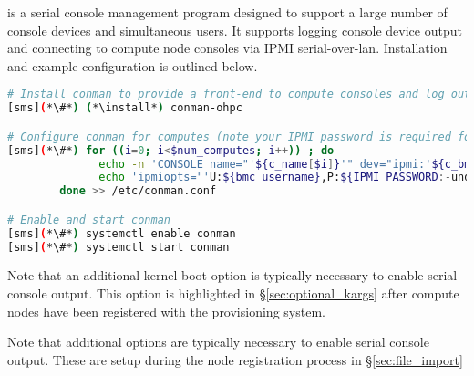 \conman{} is a serial console management program designed to support a large
number of console devices and simultaneous users. It supports logging console
device output and connecting to compute node consoles via IPMI
serial-over-lan. Installation and example configuration is outlined below.

\begin{lstlisting}[language=bash,keywords={},upquote=true]
# Install conman to provide a front-end to compute consoles and log output
[sms](*\#*) (*\install*) conman-ohpc

# Configure conman for computes (note your IPMI password is required for console access)
[sms](*\#*) for ((i=0; i<$num_computes; i++)) ; do
              echo -n 'CONSOLE name="'${c_name[$i]}'" dev="ipmi:'${c_bmc[$i]}'" '
              echo 'ipmiopts="'U:${bmc_username},P:${IPMI_PASSWORD:-undefined},W:solpayloadsize'"'
        done >> /etc/conman.conf

# Enable and start conman
[sms](*\#*) systemctl enable conman
[sms](*\#*) systemctl start conman
\end{lstlisting}

\noindent Note that an additional kernel boot option is typically necessary to
enable serial console output. This option is highlighted in \S\ref{sec:optional_kargs} after
compute nodes have been registered with the provisioning system.
\fi

\noindent Note that additional options are typically necessary to
enable serial console output. These are setup during the node registration
process in \S\ref{sec:file_import} 
\fi


